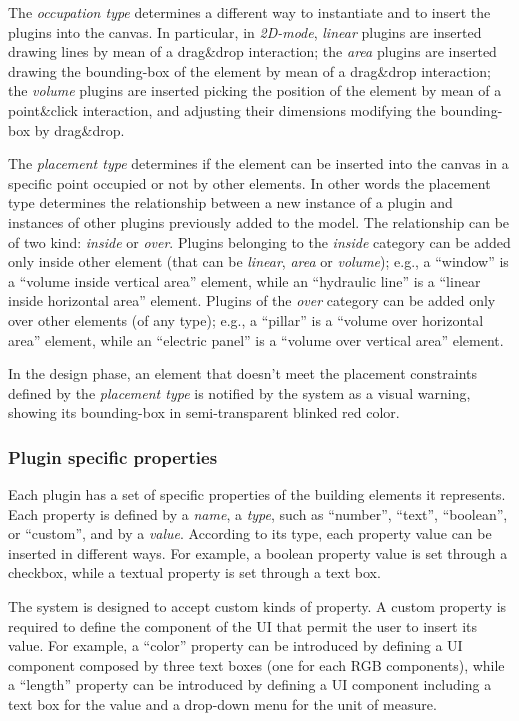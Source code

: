 The \emph{occupation type} determines a different way to instantiate and to insert the plugins into the canvas.
In particular, in \emph{2D-mode}, \emph{linear} plugins are inserted drawing lines by mean of a drag\&drop interaction;
the \emph{area} plugins are inserted drawing the bounding-box of the element by mean of a drag\&drop interaction;
the \emph{volume} plugins are inserted picking the position of the element by mean of a point\&click interaction,
and adjusting their dimensions modifying the bounding-box by drag\&drop.

The \emph{placement type} determines if the element can be inserted into the canvas in a specific point occupied or not by other elements. In other words 
the {placement type} determines the relationship between a new instance of a plugin and instances of other plugins previously added to the model. The relationship can be of two kind: \emph{inside} or \emph{over}.
Plugins belonging to the \emph{inside} category can be added only inside other element (that can be \emph{linear}, \emph{area} or \emph{volume}); e.g., a ``window'' is a ``volume inside vertical area'' element,
while an ``hydraulic line'' is a ``linear inside horizontal area'' element.
Plugins of the \emph{over} category can be added only over other elements (of any type);
e.g., a ``pillar'' is a ``volume over horizontal area'' element,
while an ``electric panel'' is a ``volume over vertical area'' element.

In the design phase, an element that doesn't meet the placement constraints defined by the \emph{placement type} is notified by the system as a visual warning, showing its bounding-box in semi-transparent blinked red color.

\subsubsection{Plugin specific properties}

\noindent Each plugin has a set of specific properties of the building elements it represents.
Each property is defined by a  \emph{name}, a \emph{type}, such as ``number'', ``text'', ``boolean'', or ``custom'', and by a \emph{value}.
According to its type, each property value can be inserted in different ways.
For example, a boolean property value is set through a checkbox, while a textual property is set through a text box.

The system is designed to accept custom kinds of property. A custom property is required to define the component of the UI that permit the user to insert its value.
For example, a ``color'' property can be introduced by defining a UI component composed by three text boxes (one for each RGB components), while a ``length'' property can be introduced by defining a UI component including a text box for the value and a drop-down menu for the unit of measure.


